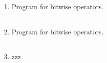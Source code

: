 \documentclass{exam}
\begin{document}
\begin{enumerate}
   \item  Program for bitwise operators.

   \begin{myTableStyle}
   \begin{center} \begin{tabular}{ |m{14cm}| } \hline
              \\ \hline
    \end{tabular} \end{center}
\end{myTableStyle}
  \pagebreak

   \item  Program for bitwise operators.

   \begin{myTableStyle}
   \begin{center} \begin{tabular}{ |m{14cm}| } \hline
              \\ \hline
    \end{tabular} \end{center}
\end{myTableStyle}
  \pagebreak

  \item  zzz
  \end{enumerate}
\end{document}

